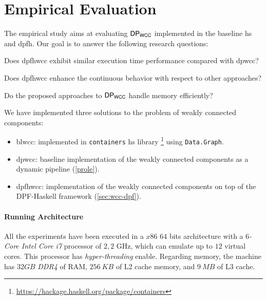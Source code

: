 \section{Empirical Evaluation}\label{sec:new:eval}
%
The empirical study aims at evaluating $\mathsf{DP_{WCC}}$ implemented in the baseline \acrshort{hs} and \acrshort{dpfh}. Our goal is to answer the following research questions: 

\begin{inparaenum}[\bf {\bf RQ}1\upshape)]
\label{res:question}
    \item Does \acrshort{dpfhwcc} exhibit similar execution time performance compared with \acrshort{dpwcc}?
    \item Does \acrshort{dpfhwcc} enhance the continuous behavior with respect to other approaches?
    \item Do the proposed approaches to $\mathsf{DP_{WCC}}$ handle memory efficiently?
\end{inparaenum}

We have implemented three solutions to the problem of weakly connected components:
\begin{itemize}
\item \acrshort{blwcc}: implemented in \texttt{containers} \acrshort{hs} library \footnote{\url{https://hackage.haskell.org/package/containers}} using \texttt{Data.Graph}.
\item \acrshort{dpwcc}: baseline implementation of the weakly connected components as a dynamic pipeline (\autoref{prole}).
\item \acrshort{dpfhwcc}: implementation of the weakly connected components on top of the DPF-Haskell framework (\autoref{sec:wcc-dpf}). 
\end{itemize}

\paragraph{Running Architecture}
All the experiments have been executed in a $x86$ $64$ bits architecture with a \textit{$6$-Core Intel Core i7} processor of $2,2$ GHz, which can emulate up to $12$ virtual cores. This processor has \emph{hyper-threading} enable. Regarding memory, the machine has $32 GB$ \emph{DDR4} of RAM, $256\ KB$ of L2 cache memory, and $9\ MB$ of L3 cache.

